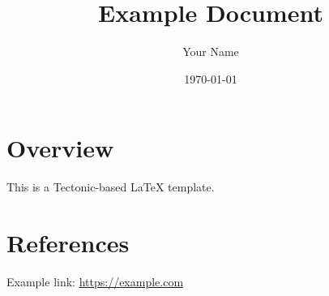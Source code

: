 \documentclass{article}
\title{Example Document}
\author{Your Name}
\date{\today}
\begin{document}
\maketitle

\section{Overview}

This is a Tectonic-based LaTeX template.

\section{References}

Example link: \url{https://example.com}
\end{document}
